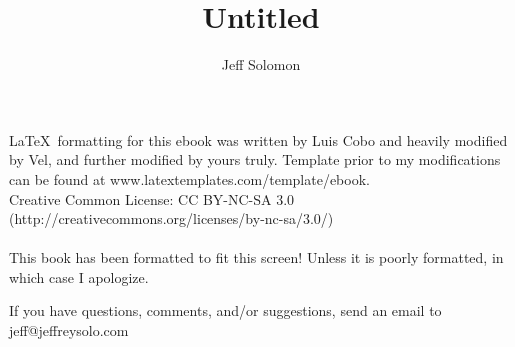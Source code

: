 \documentclass[oneside,11pt]{memoir} %
\title{Untitled} %
\author{Jeff Solomon} %
\newcommand{\other}{OTHER} %
\begin{document}
\frontmatter


\thispagestyle{empty} %
%
%
\newpage %


\thispagestyle{empty}
\begin{acknowledgments}
\LaTeX\ formatting for this ebook was written by Luis Cobo and heavily modified by Vel, and further modified by yours truly. 
Template prior to my modifications can be found at www.latextemplates.com/template/ebook. \\Creative Common License: CC BY-NC-SA 3.0 \\ (http://creativecommons.org/licenses/by-nc-sa/3.0/)\\
\\ This book has been formatted to fit this screen! Unless it is poorly formatted, in which case I apologize.\\
\end{acknowledgments}
\begin{center}
\par\vspace*{\fill}\noindent
If you have questions, comments, and/or suggestions, send an email to jeff@jeffreysolo.com
\end{center}
\newpage
\end{document}
